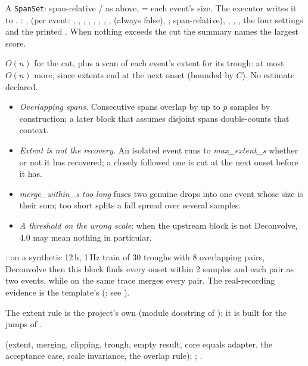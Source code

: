 A \texttt{SpanSet}: span-relative / as above,  = each
event's size. The executor writes it to . : ,
 (per event: , , ,
, , , , ,
 (always false), ; span-relative), ,
, , the four settings and the printed .
When nothing exceeds the cut the summary names the largest score.

$O(n)$ for the cut, plus a scan of each event's extent for its trough: at most $O(n)$ more,
since extents end at the next onset (bounded by $C$). No estimate declared.

\begin{itemize}
\item \emph{Overlapping spans.} Consecutive spans overlap by up to $p$ samples by
  construction; a later block that assumes disjoint spans double-counts that context.
\item \emph{Extent is not the recovery.} An isolated event runs to \emph{max\_extent\_s}
  whether or not it has recovered; a closely followed one is cut at the next onset before it
  has.
\item \emph{merge\_within\_s too long} fuses two genuine drops into one event whose size is
  their sum; too short splits a fall spread over several samples.
\item \emph{A threshold on the wrong scale}: when the upstream block is not Deconvolve, 4.0 may
  mean nothing in particular.
\end{itemize}

: on a synthetic 12\,h, 1\,Hz train of 30 troughs
with 8 overlapping pairs, Deconvolve then this block finds every onset within 2 samples and
each pair as two events, while  on the same trace merges
every pair. The real-recording evidence is the template's
(; see ).

The extent rule is the project's own (module docstring of ); it is built
for the jumps of \citet{friedrich2017fast}.

 (extent, merging, clipping, trough, empty result,
core equals adapter, the acceptance case, scale invariance, the overlap rule);
; .
